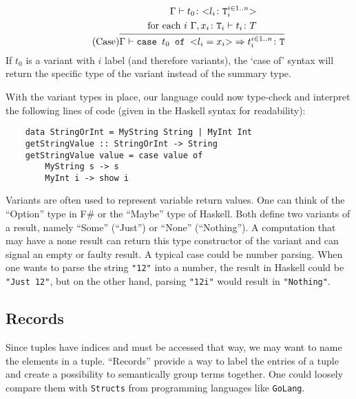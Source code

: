 \begin{equation*}
    \tag{Case}
    \infer{
    \Gamma \vdash \texttt{case } t_0 \texttt{ of } \text{<}l_i=x_i\text{>} \Rightarrow t_i^{i \in 1..n} \colon \texttt{T}
    }{
    \begin{split}
        \Gamma \vdash t_0 \colon \text{<}l_i \colon \texttt{T}_i^{i \in 1..n}\text{>} \\
        \text{for each } i \text{    } \Gamma, x_i \colon \texttt{T}_i \vdash t_i \colon T
    \end{split}
    }
\end{equation*}
If $t_0$ is a variant with $i$ label (and therefore variants), the `case of' syntax
will return the specific type of the variant instead of the summary type.

With the variant types in place, our language could now type-check and interpret
the following lines of code (given in the Haskell syntax for readability):

\begin{verbatim}
    data StringOrInt = MyString String | MyInt Int
    getStringValue :: StringOrInt -> String
    getStringValue value = case value of
        MyString s -> s
        MyInt i -> show i
\end{verbatim}

Variants are often used to represent variable return values.
One can think of the ``Option'' type in F\# or the ``Maybe'' type
of Haskell. Both define two variants of a result, namely ``Some'' (``Just'')
or ``None'' (``Nothing''). A computation that may have a none result can return
this type constructor of the variant and can signal an empty or faulty result.
A typical case could be number parsing. When one wants to parse the string
\texttt{"12"} into a number, the result in Haskell could be \texttt{"Just 12"}, but
on the other hand, parsing \texttt{"12i"} would result in \texttt{"Nothing"}.

\subsection{Records}
\label{subsec:Records}

Since tuples have indices and must be accessed that way, we may want to
name the elements in a tuple. ``Records'' provide a way to label the entries
of a tuple and create a possibility to semantically group terms together.
One could loosely compare them with \texttt{Structs} from programming
languages like \texttt{GoLang}.

